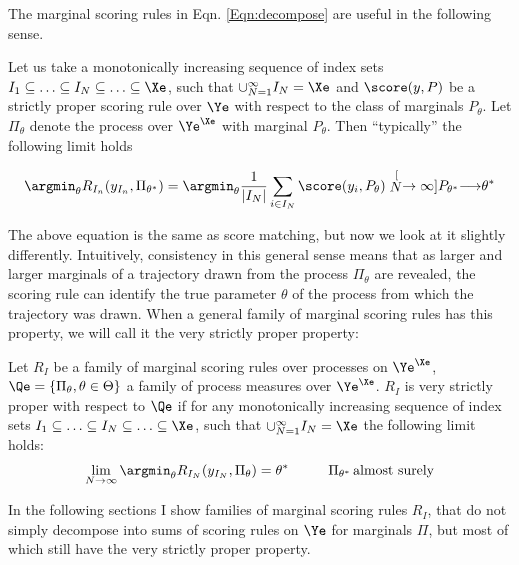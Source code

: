 The marginal scoring rules in Eqn. \eqref{Eqn:decompose} are useful in the following sense.

\begin{statement}
Let us take a monotonically increasing sequence of index sets $I_1\subseteq\ldots\subseteq I_N \subseteq \ldots \subseteq \Xe$, such that $\cup_{N=1}^{\infty} I_N = \Xe$ and $\score(y,P)$ be a strictly proper scoring rule over $\Ye$ with respect to the class of marginals $P_{\theta}$. Let $\Pi_{\theta}$ denote the \iid process over $\Ye^{\Xe}$ with marginal $P_{\theta}$. Then ``typically'' the following limit holds

\begin{align}
\argmin_{\theta}R_{I_n}(y_{I_n},\Pi_{\theta^{*}}) =  \argmin_{\theta} \frac{1}{\vert I_N \vert} \sum_{i\in I_N} \score(y_i,P_{\theta}) \stackrel[N\rightarrow\infty]{P_{\theta^{*}}}{\longrightarrow} \theta^{*}
\end{align}
\end{statement}

The above equation is the same as score matching, but now we look at it slightly differently. Intuitively, consistency in this general sense means that as larger and larger marginals of a trajectory drawn from the process $\Pi_{\theta}$ are revealed, the scoring rule can identify the true parameter $\theta$ of the process from which the trajectory was drawn. When a general family of marginal scoring rules has this property, we will call it the very strictly proper property:

\begin{definition}\label{thm:very_strictly_proper}
Let $R_{I}$ be a family of marginal scoring rules over processes on $\Ye^{\Xe}$, $\Qe = \{\Pi_\theta, \theta\in\Theta\}$ a family of process measures over $\Ye^{\Xe}$. $R_{I}$ is very strictly proper with respect to $\Qe$ if for any monotonically increasing sequence of index sets $I_1\subseteq\ldots\subseteq I_N \subseteq \ldots \subseteq \Xe$, such that $\cup_{N=1}^{\infty} I_N = \Xe$ the following limit holds:
\begin{align}
\lim_{N\rightarrow\infty} \argmin_{\theta} R_{I_N}(y_{I_N},\Pi_{\theta}) = \theta^{*}\hspace{1cm}\Pi_{\theta^{*}}\mbox{\,almost surely}
\end{align}
\end{definition}

In the following sections I show families of marginal scoring rules $R_I$, that do not simply decompose into sums of scoring rules on $\Ye$ for marginals $\Pi$, but most of which still have the very strictly proper property.

